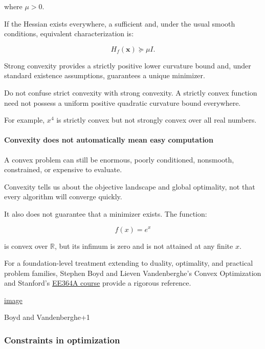 where \(\mu>0\).

If the Hessian exists everywhere, a sufficient and, under the usual smooth conditions, equivalent characterization is:

\[
H_f(\mathbf x)\succeq\mu I.
\]

Strong convexity provides a strictly positive lower curvature bound and, under standard existence assumptions, guarantees a unique minimizer.

Do not confuse strict convexity with strong convexity. A strictly convex function need not possess a uniform positive quadratic curvature bound everywhere.

For example, \(x^4\) is strictly convex but not strongly convex over all real numbers.

\paragraph{Convexity does not automatically mean easy computation}\label{02-foundations-ii-ch026-convexity-does-not-automatically-mean-easy-computation}

\hypertarget{02-foundations-ii-ch026-convexity-does-not-automatically-mean-easy-computation}{}

A convex problem can still be enormous, poorly conditioned, nonsmooth, constrained, or expensive to evaluate.

Convexity tells us about the objective landscape and global optimality, not that every algorithm will converge quickly.

It also does not guarantee that a minimizer exists. The function:

\[
f(x)=e^x
\]

is convex over \(\mathbb R\), but its infimum is zero and is not attained at any finite \(x\).

For a foundation-level treatment extending to duality, optimality, and practical problem families, Stephen Boyd and Lieven Vandenberghe's Convex Optimization and Stanford's \href{https://web.stanford.edu/class/ee364a/?utm_source=chatgpt.com}{EE364A course} provide a rigorous reference. 

\href{https://www.google.com/s2/favicons?domain=https://stanford.edu&sz=32}{image}

Boyd and Vandenberghe+1

\subsubsection{Constraints in optimization}\label{02-foundations-ii-ch026-constraints-in-optimization}

